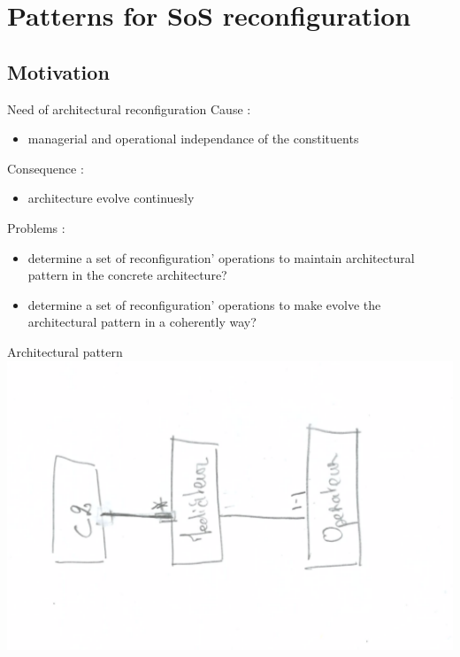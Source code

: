\documentclass{beamer}
\begin{document}
\section{Patterns for SoS reconfiguration}
\subsection{Motivation}
\begin{frame}{Need of architectural reconfiguration} 
  Cause :
  \begin{itemize}
  \item managerial and operational independance of the constituents
  \end{itemize}
  Consequence :
  \begin{itemize}
  \item architecture evolve continuesly
  \end{itemize}
  Problems :
  \begin{itemize}
  \item determine a set of reconfiguration' operations to maintain architectural pattern in the concrete architecture?
  \item determine a set of reconfiguration' operations to make evolve the architectural pattern in a coherently way?   
  \end{itemize}
\end{frame}

\begin{frame}{Architectural pattern}
  \includegraphics[angle=-90, scale=0.5]{pattern-emergency-service}
\end{frame}
\end{document}
